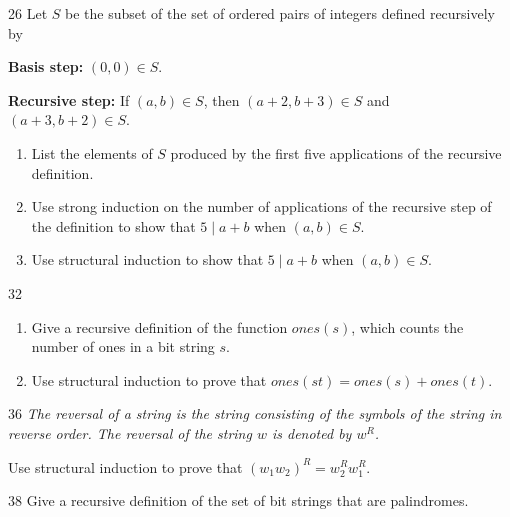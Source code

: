 \documentclass[11pt]{article}
\begin{document}
\begin{exercise}{26}
    Let $S$ be the subset of the set of ordered pairs of integers
    defined recursively by

    \textbf{Basis step:} $(0,0) \in S$.

    \textbf{Recursive step:} If $(a,b) \in S$, then $(a+2, b+3) \in S$
    and $(a+3, b+2) \in S$.
    \begin{enumerate}[label=(\alph*)]
        \item List the elements of $S$ produced by the first five
        applications of the recursive definition.
        \item Use strong induction on the number of applications of
        the recursive step of the definition to show that
        $5 \mid a+b$ when $(a,b) \in S$.
        \item Use structural induction to show that $5 \mid a+b$ when
        $(a,b) \in S$.
    \end{enumerate}
\end{exercise}

\begin{exercise}{32}
    \begin{enumerate}[label=(\alph*)]
        \item Give a recursive definition of the function $ones(s)$,
        which counts the number of ones in a bit string $s$.
        \item Use structural induction to prove that
        $ones(st) = ones(s) + ones(t)$.
    \end{enumerate}
\end{exercise}

\begin{exercise}{36}
    \textit{The reversal of a string is the string consisting of the
    symbols of the string in reverse order. The reversal of the
    string $w$ is denoted by $w^R$.}

    Use structural induction to prove that
    $(w_1 w_2)^R = w_2^R w_1^R$.
\end{exercise}

\begin{exercise}{38}
    Give a recursive definition of the set of bit strings that are
    palindromes.
\end{exercise}
\end{document}
